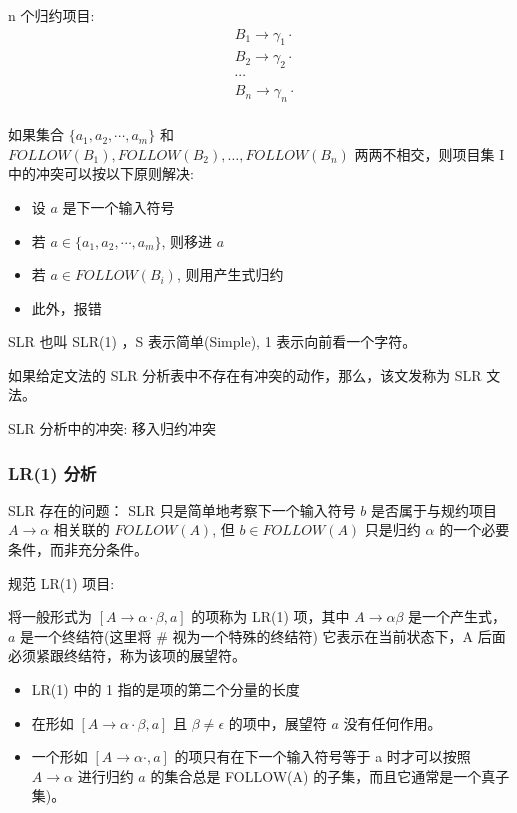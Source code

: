 n 个归约项目:
\begin{equation}
    \begin{aligned}
         & B_1 \rightarrow \gamma_1 \cdot \\
         & B_2 \rightarrow \gamma_2 \cdot \\
         & \cdots                         \\
         & B_n \rightarrow \gamma_n \cdot \\
         & \nonumber
    \end{aligned}
\end{equation}

如果集合 $\{a_1, a_2, \cdots, a_m\}$ 和 $FOLLOW(B_1), FOLLOW(B_2), \dots, FOLLOW(B_n)$ 两两不相交，则项目集 I 中的冲突可以按以下原则解决:
\begin{itemize}
    \item 设 $a$ 是下一个输入符号
    \item 若 $a \in \{a_1,a_2,\cdots,a_m\}$, 则移进 $a$
    \item 若 $a \in FOLLOW(B_i)$, 则用产生式归约
    \item 此外，报错
\end{itemize}

SLR 也叫 SLR(1) ，S 表示简单(Simple), 1 表示向前看一个字符。

如果给定文法的 SLR 分析表中不存在有冲突的动作，那么，该文发称为 SLR 文法。

SLR 分析中的冲突: 移入归约冲突

\subsubsection{\textcolor{imp}{LR(1) 分析}}

SLR 存在的问题： SLR 只是简单地考察下一个输入符号 $b$ 是否属于与规约项目 $A \rightarrow \alpha$ 相关联的 $FOLLOW(A)$, 但 $b \in FOLLOW(A)$ 只是归约 $\alpha$ 的一个必要条件，而非充分条件。

规范 LR(1) 项目:

将一般形式为 $[A \rightarrow \alpha \cdot \beta, a]$ 的项称为 LR(1) 项，其中 $A \rightarrow \alpha \beta$ 是一个产生式， $a$ 是一个终结符(这里将 \# 视为一个特殊的终结符) 它表示在当前状态下，A 后面必须紧跟终结符，称为该项的展望符。

\begin{itemize}
    \item LR(1) 中的 1 指的是项的第二个分量的长度
    \item 在形如 $[A \rightarrow \alpha \cdot \beta ,a]$ 且 $\beta \neq \epsilon$ 的项中，展望符 $a$ 没有任何作用。
    \item 一个形如 $[A \rightarrow \alpha \cdot, a]$ 的项只有在下一个输入符号等于 a 时才可以按照 $A \rightarrow \alpha$ 进行归约 $a$ 的集合总是 FOLLOW(A) 的子集，而且它通常是一个真子集)。
\end{itemize}

